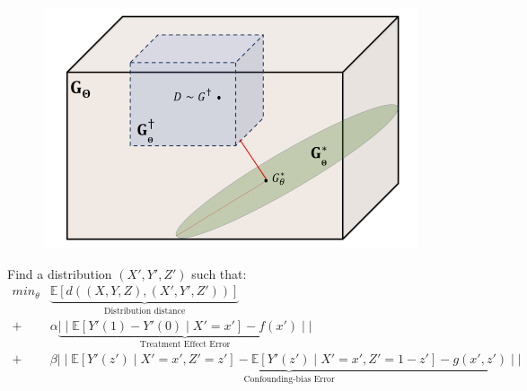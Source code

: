 \documentclass{beamer}
\begin{document}
\begin{frame}
	\frametitle{}
	\begin{figure}
		\centering
		\includegraphics[scale=0.45]{imgs/distributions.png}
	\end{figure}
	Find a distribution $ (X', Y', Z') $ such that:
		\begin{equation*}
			\begin{split}
				min_{\theta} & \underbrace{\mathbb{E}[d((X, Y, Z), (X', Y', Z'))]}_{\text{Distribution distance}} \\
				+ & \alpha \underbrace{\mid\mid \mathbb{E}[Y'(1) - Y'(0) \mid X'=x'] - f(x') \mid \mid}_{\text{Treatment Effect Error}}  \\
				+ & \beta \underbrace{\mid \mid \mathbb{E}[Y'(z') \mid X'=x', Z'=z'] - \mathbb{E}[Y'(z') \mid X'=x', Z'=1-z'] - g(x', z') \mid \mid}_{\text{Confounding-bias Error}} \\
			\end{split}
		\end{equation*}
\end{frame}
\end{document}
